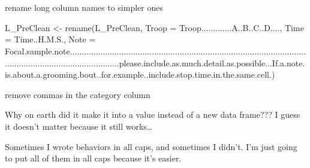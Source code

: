 \documentclass[
  letterpaper,
  DIV=11,
  numbers=noendperiod]{scrartcl}
\newenvironment{Shaded}{\begin{snugshade}}{\end{snugshade}}
\newcommand{\AttributeTok}[1]{\textcolor[rgb]{0.40,0.45,0.13}{#1}}
\newcommand{\FunctionTok}[1]{\textcolor[rgb]{0.28,0.35,0.67}{#1}}
\newcommand{\NormalTok}[1]{\textcolor[rgb]{0.00,0.23,0.31}{#1}}
\newcommand{\OtherTok}[1]{\textcolor[rgb]{0.00,0.23,0.31}{#1}}
\newcommand{\SpecialCharTok}[1]{\textcolor[rgb]{0.37,0.37,0.37}{#1}}
\newcommand{\StringTok}[1]{\textcolor[rgb]{0.13,0.47,0.30}{#1}}
\begin{document}
\begin{verbatim}
                                                                                                                                                                                                                                                                                                        
                                                                                                                                                                                                                                                                                                        
\end{verbatim}

rename long column names to simpler ones

\begin{Shaded}
\begin{Highlighting}[]
\NormalTok{L\_PreClean }\OtherTok{\textless{}{-}} \FunctionTok{rename}\NormalTok{(L\_PreClean, }\AttributeTok{Troop =}\NormalTok{ Troop.............A..B..C..D...., }\AttributeTok{Time =}\NormalTok{ Time..H.M.S., }\AttributeTok{Note =}\NormalTok{ Focal.sample.note......................................................................................................................................................please.include.as.much.detail.as.possible...If.a.note.is.about.a.grooming.bout..for.example..include.stop.time.in.the.same.cell.)}
\end{Highlighting}
\end{Shaded}

remove commas in the category column

\begin{Shaded}
\end{Shaded}

Why on earth did it make it into a value instead of a new data frame???
I guess it doesn't matter because it still works\ldots{}

Sometimes I wrote behaviors in all caps, and sometimes I didn't. I'm
just going to put all of them in all caps because it's easier.

\begin{Shaded}
\end{Shaded}
\end{document}
